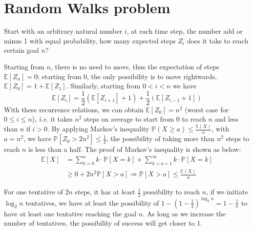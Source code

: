 \documentclass[runningheads]{llncs}
\begin{document}
\section{Random Walks problem}\label{appendix:A}
\begin{definition}
Start with an arbitrary natural number $i$, at each time step, the number add or minus 1 with equal probability, how many expected steps $Z_i$ does it take to reach certain goal $n$?
\end{definition}
Starting from $n$, there is no need to move, thus the expectation of steps $\mathbb {E}[Z_n]=0$; starting from $0$, the only possibility is to move rightwards, $\mathbb {E}[Z_0]=1+\mathbb {E}[Z_1]$. 
Similarly, starting from $0<i<n$ we have $$\mathbb {E}[Z_i]=\frac{1}{2} (\mathbb {E}[Z_{i+1}]+1)+\frac{1}{2} (\mathbb {E}[Z_{i-1}+1])$$
With these recurrence relations, we can obtain $\mathbb {E}[Z_0]=n^2$ (worst case for $0\leq i\leq n$), \textit{i.e.} it takes $n^2$ steps on average to start from 0 to reach $n$ and less than $n$ if $i>0$. 
By applying Markov's inequality $\mathbb {P} (X\geq a)\leq {\frac {\mathbb {E} (X)}{a}}$, with $a=n^2$, we have $\mathbb {P}[Z_0>2n^2]\leq \frac{1}{2}$, the possibility of taking more than $n^2$ steps to reach $n$ is less than a half. 
The proof of Markov's inequality is shown as below:
\begin{align*}
\mathbb {E}[X]&=\sum_{k=0}^{a}k\cdot \mathbb {P}[X=k]+\sum_{k=a+1}^{\infty}k\cdot \mathbb {P}[X=k]\\
&\geq 0+2n^2\mathbb {P}[X>a]
\Rightarrow \mathbb {P}[X>a]\leq \frac {\mathbb {E} (X)}{a}
\end{align*}

For one tentative of $2n$ steps, it has at least $\frac{1}{2}$ possibility to reach $n$, if we initiate $\log_2n$ tentatives, we have at least the possibility of $1- (1-\frac{1}{2})^{\log_2n}=1-\frac{1}{n}$ to have at least one tentative reaching the goal $n$.
As long as we increase the number of tentatives, the possibility of success will get closer to $1$. 
\end{document}
